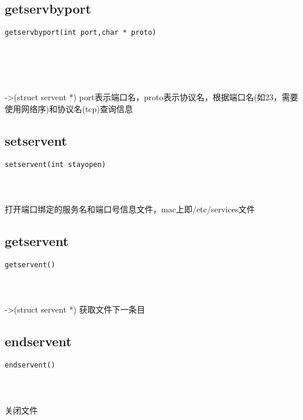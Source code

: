 \documentclass[10pt,a4paper]{article}
\begin{document}
\subsection{getservbyport}
\begin{spacing}{2.0}
\lstset{language=C,numbers=none}
\begin{lstlisting}
getservbyport(int port,char * proto)
\end{lstlisting}
{\large\color[rgb]{0.2,0.4,0.6}{port:}} \\
{\large\color[rgb]{0.2,0.4,0.6}{proto:}}
\paragraph{ \ \ }->(struct servent *) port表示端口名，proto表示协议名，根据端口名(如23，需要使用网络序)和协议名(tcp)查询信息
\end{spacing}

\subsection{setservent}
\begin{spacing}{2.0}
\lstset{language=C,numbers=none}
\begin{lstlisting}
setservent(int stayopen)
\end{lstlisting}
{\large\color[rgb]{0.2,0.4,0.6}{stayopen:}}
\paragraph{ \ \ }打开端口绑定的服务名和端口号信息文件，mac上即/etc/services文件
\end{spacing}

\subsection{getservent}
\begin{spacing}{2.0}
\lstset{language=C,numbers=none}
\begin{lstlisting}
getservent()
\end{lstlisting}
\paragraph{ \ \ }->(struct servent *) 获取文件下一条目
\end{spacing}

\subsection{endservent}
\begin{spacing}{2.0}
\lstset{language=C,numbers=none}
\begin{lstlisting}
endservent()
\end{lstlisting}
\paragraph{ \ \ }关闭文件
\end{spacing}
\end{document}
